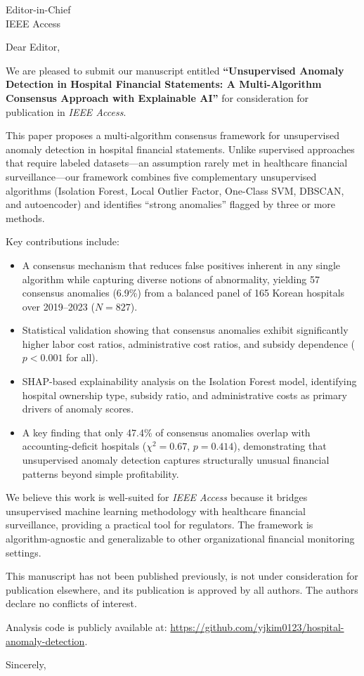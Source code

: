 \documentclass[11pt]{letter}
\begin{document}
\begin{letter}{Editor-in-Chief \\ IEEE Access}

\opening{Dear Editor,}

We are pleased to submit our manuscript entitled \textbf{``Unsupervised Anomaly Detection in Hospital Financial Statements: A Multi-Algorithm Consensus Approach with Explainable AI''} for consideration for publication in \textit{IEEE Access}.

This paper proposes a multi-algorithm consensus framework for unsupervised anomaly detection in hospital financial statements. Unlike supervised approaches that require labeled datasets---an assumption rarely met in healthcare financial surveillance---our framework combines five complementary unsupervised algorithms (Isolation Forest, Local Outlier Factor, One-Class SVM, DBSCAN, and autoencoder) and identifies ``strong anomalies'' flagged by three or more methods.

Key contributions include:

\begin{itemize}
\item A consensus mechanism that reduces false positives inherent in any single algorithm while capturing diverse notions of abnormality, yielding 57 consensus anomalies (6.9\%) from a balanced panel of 165 Korean hospitals over 2019--2023 ($N = 827$).
\item Statistical validation showing that consensus anomalies exhibit significantly higher labor cost ratios, administrative cost ratios, and subsidy dependence ($p < 0.001$ for all).
\item SHAP-based explainability analysis on the Isolation Forest model, identifying hospital ownership type, subsidy ratio, and administrative costs as primary drivers of anomaly scores.
\item A key finding that only 47.4\% of consensus anomalies overlap with accounting-deficit hospitals ($\chi^2 = 0.67$, $p = 0.414$), demonstrating that unsupervised anomaly detection captures structurally unusual financial patterns beyond simple profitability.
\end{itemize}

We believe this work is well-suited for \textit{IEEE Access} because it bridges unsupervised machine learning methodology with healthcare financial surveillance, providing a practical tool for regulators. The framework is algorithm-agnostic and generalizable to other organizational financial monitoring settings.

This manuscript has not been published previously, is not under consideration for publication elsewhere, and its publication is approved by all authors. The authors declare no conflicts of interest.

Analysis code is publicly available at: \url{https://github.com/yjkim0123/hospital-anomaly-detection}.

\closing{Sincerely,}

\end{letter}
\end{document}
